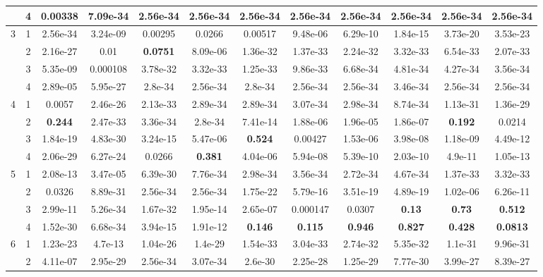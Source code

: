\begin{landscape}
\begin{table}[htbp]
\begin{center}
{\begin{tabular}{cccccccccccc}
             & 4 & 0.00338 & 7.09e-34 & 2.56e-34 & 2.56e-34 & 2.56e-34 & 2.56e-34 & 2.56e-34 & 2.56e-34 & 2.56e-34 & 2.56e-34 \\
            \hline
            \multirow{4}{*}{3} & 1 & 2.56e-34 & 3.24e-09 & 0.00295 & 0.0266 & 0.00517 & 9.48e-06 & 6.29e-10 & 1.84e-15 & 3.73e-20 & 3.53e-23 \\
             & 2 & 2.16e-27 & 0.01 & \textbf{0.0751} & 8.09e-06 & 1.36e-32 & 1.37e-33 & 2.24e-32 & 3.32e-33 & 6.54e-33 & 2.07e-33 \\
             & 3 & 5.35e-09 & 0.000108 & 3.78e-32 & 3.32e-33 & 1.25e-33 & 9.86e-33 & 6.68e-34 & 4.81e-34 & 4.27e-34 & 3.56e-34 \\
             & 4 & 2.89e-05 & 5.95e-27 & 2.8e-34 & 2.56e-34 & 2.8e-34 & 2.56e-34 & 2.56e-34 & 3.46e-34 & 2.56e-34 & 2.56e-34 \\
            \hline
            \multirow{4}{*}{4} & 1 & 0.0057 & 2.46e-26 & 2.13e-33 & 2.89e-34 & 2.89e-34 & 3.07e-34 & 2.98e-34 & 8.74e-34 & 1.13e-31 & 1.36e-29 \\
             & 2 & \textbf{0.244} & 2.47e-33 & 3.36e-34 & 2.8e-34 & 7.41e-14 & 1.88e-06 & 1.96e-05 & 1.86e-07 & \textbf{0.192} & 0.0214 \\
             & 3 & 1.84e-19 & 4.83e-30 & 3.24e-15 & 5.47e-06 & \textbf{0.524} & 0.00427 & 1.53e-06 & 3.98e-08 & 1.18e-09 & 4.49e-12 \\
             & 4 & 2.06e-29 & 6.27e-24 & 0.0266 & \textbf{0.381} & 4.04e-06 & 5.94e-08 & 5.39e-10 & 2.03e-10 & 4.9e-11 & 1.05e-13 \\
            \hline
            \multirow{4}{*}{5} & 1 & 2.08e-13 & 3.47e-05 & 6.39e-30 & 7.76e-34 & 2.98e-34 & 3.56e-34 & 2.72e-34 & 4.67e-34 & 1.37e-33 & 3.32e-33 \\
             & 2 & 0.0326 & 8.89e-31 & 2.56e-34 & 2.56e-34 & 1.75e-22 & 5.79e-16 & 3.51e-19 & 4.89e-19 & 1.02e-06 & 6.26e-11 \\
             & 3 & 2.99e-11 & 5.26e-34 & 1.67e-32 & 1.95e-14 & 2.65e-07 & 0.000147 & 0.0307 & \textbf{0.13} & \textbf{0.73} & \textbf{0.512} \\
             & 4 & 1.52e-30 & 6.68e-34 & 3.94e-15 & 1.91e-12 & \textbf{0.146} & \textbf{0.115} & \textbf{0.946} & \textbf{0.827} & \textbf{0.428} & \textbf{0.0813} \\
            \hline
            \multirow{4}{*}{6} & 1 & 1.23e-23 & 4.7e-13 & 1.04e-26 & 1.4e-29 & 1.54e-33 & 3.04e-33 & 2.74e-32 & 5.35e-32 & 1.1e-31 & 9.96e-31 \\
             & 2 & 4.11e-07 & 2.95e-29 & 2.56e-34 & 3.07e-34 & 2.6e-30 & 2.25e-28 & 1.25e-29 & 7.77e-30 & 3.99e-27 & 8.39e-27 \\

\end{tabular}}
\end{center}
\end{table}
\end{landscape}
